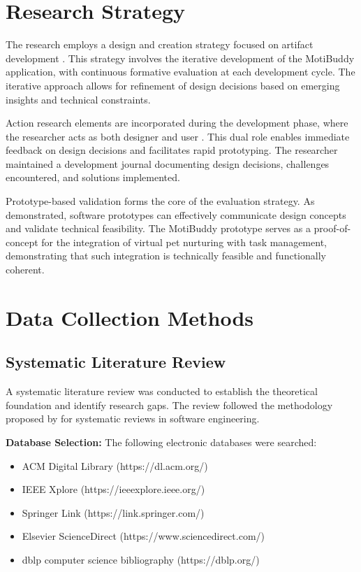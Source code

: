 \section{Research Strategy}
\label{sec:research-strategy}

\completed

The research employs a design and creation strategy focused on artifact development \citep{oates2006research}. This strategy involves the iterative development of the MotiBuddy application, with continuous formative evaluation at each development cycle. The iterative approach allows for refinement of design decisions based on emerging insights and technical constraints.

Action research elements are incorporated during the development phase, where the researcher acts as both designer and user \citep{baskerville1999investigating}. This dual role enables immediate feedback on design decisions and facilitates rapid prototyping. The researcher maintained a development journal documenting design decisions, challenges encountered, and solutions implemented.

Prototype-based validation forms the core of the evaluation strategy. As \citet{wallace1989use} demonstrated, software prototypes can effectively communicate design concepts and validate technical feasibility. The MotiBuddy prototype serves as a proof-of-concept for the integration of virtual pet nurturing with task management, demonstrating that such integration is technically feasible and functionally coherent.

\section{Data Collection Methods}
\label{sec:data-collection}

\subsection{Systematic Literature Review}

\completed

A systematic literature review was conducted to establish the theoretical foundation and identify research gaps. The review followed the methodology proposed by \citet{kitchenham2004procedures} for systematic reviews in software engineering.

\textbf{Database Selection:} The following electronic databases were searched:
\begin{itemize}
    \item ACM Digital Library (https://dl.acm.org/)
    \item IEEE Xplore (https://ieeexplore.ieee.org/)
    \item Springer Link (https://link.springer.com/)
    \item Elsevier ScienceDirect (https://www.sciencedirect.com/)
    \item dblp computer science bibliography (https://dblp.org/)
\end{itemize}

